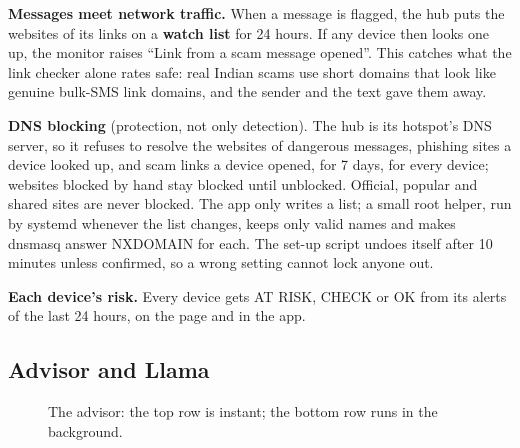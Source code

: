 \documentclass[11pt,a4paper]{article}
\begin{document}
\textbf{Messages meet network traffic.} When a message is flagged, the hub puts the websites of its links on a
\textbf{watch list} for 24 hours. If any device then looks one up, the monitor raises ``Link from a scam message
opened''. This catches what the link checker alone rates safe: real Indian scams use short domains that look like
genuine bulk-SMS link domains, and the sender and the text gave them away.

\textbf{DNS blocking} (protection, not only detection). The hub is its hotspot's DNS server, so it refuses to resolve
the websites of dangerous messages, phishing sites a device looked up, and scam links a device opened, for 7 days,
for every device; websites blocked by hand stay blocked until unblocked. Official, popular and shared sites are never
blocked. The app only writes a list; a small root helper, run by systemd whenever the list changes, keeps only valid
names and makes dnsmasq answer NXDOMAIN for each. The set-up script undoes itself after 10 minutes unless confirmed,
so a wrong setting cannot lock anyone out.

\textbf{Each device's risk.} Every device gets AT RISK, CHECK or OK from its alerts of the last 24 hours, on the page
and in the app.

\subsection{Advisor and Llama}
\label{sec:llama}

\begin{figure}[H]
\centering
{}
\caption{The advisor: the top row is instant; the bottom row runs in the background.}
\label{fig:adv}
\end{figure}
\end{document}
